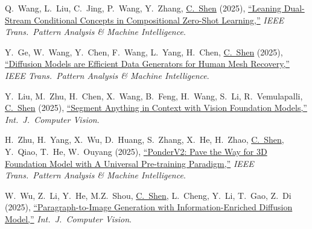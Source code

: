 \documentclass[9pt, a4paper]{article}
\newcommand{\years}[1]{\marginnote{\scriptsize #1}}
\def\highlight{\uline}
\begin{document}
\medskip

\years{2025} Q.~Wang, L.~Liu, C.~Jing, P.~Wang, Y.~Zhang, \highlight{C.~Shen} (2025),
\href{http://www.google.com/search?lr=&ie=UTF-8&oe=UTF-8&q=Leaning+Dual-Stream+Conditional+Concepts+in+Compositional+Zero-Shot+Learning+Qingsheng+Wang%2C+Lingqiao+Liu%2C+Chenchen+Jing%2C+Peng+Wang%2C+Yanning+Zhang%2C+Chunhua+Shen}{``Leaning Dual-Stream Conditional Concepts in Compositional Zero-Shot Learning,{}''}
\emph{IEEE Trans.\  Pattern Analysis \& Machine Intelligence}.

\medskip

\years{2025} Y.~Ge, W.~Wang, Y.~Chen, F.~Wang, L.~Yang, H.~Chen, \highlight{C.~Shen} (2025),
\href{http://www.google.com/search?lr=&ie=UTF-8&oe=UTF-8&q=Diffusion+Models+are+Efficient+Data+Generators+for+Human+Mesh+Recovery+Yongtao+Ge%2C+Wenjia+Wang%2C+Yongfan+Chen%2C+Fanzhou+Wang%2C+Lei+Yang%2C+Hao+Chen%2C+Chunhua+Shen}{``Diffusion Models are Efficient Data Generators for Human Mesh Recovery,{}''}
\emph{IEEE Trans.\  Pattern Analysis \& Machine Intelligence}.

\medskip

\years{2025} Y.~Liu, M.~Zhu, H.~Chen, X.~Wang, B.~Feng, H.~Wang, S.~Li, R.~Vemulapalli, \highlight{C.~Shen} (2025),
\href{http://www.google.com/search?lr=&ie=UTF-8&oe=UTF-8&q=Segment+Anything+in+Context+with+Vision+Foundation+Models+Yang+Liu%2C+Muzhi+Zhu%2C+Hao+Chen%2C+Xinlong+Wang%2C+Bo+Feng%2C+Hao+Wang%2C+Shiyu+Li%2C+Raviteja+Vemulapalli%2C+Chunhua+Shen}{``Segment Anything in Context with Vision Foundation Models,{}''}
\emph{Int.\ J.\  Computer Vision}.

\medskip

\years{2025} H.~Zhu, H.~Yang, X.~Wu, D.~Huang, S.~Zhang, X.~He, H.~Zhao, \highlight{C.~Shen}, Y.~Qiao, T.~He, W.~Ouyang (2025),
\href{http://www.google.com/search?lr=&ie=UTF-8&oe=UTF-8&q=PonderV2%3A+Pave+the+Way+for+3D+Foundation+Model+with+A+Universal+Pre-training+Paradigm+Haoyi+Zhu%2C+Honghui+Yang%2C+Xiaoyang+Wu%2C+Di+Huang%2C+Sha+Zhang%2C+Xianglong+He%2C+Hengshuang+Zhao%2C+Chunhua+Shen%2C+Yu+Qiao%2C+Tong+He%2C+Wanli+Ouyang}{``{PonderV2}: Pave the Way for {3D} Foundation Model with A Universal Pre-training Paradigm,{}''}
\emph{IEEE Trans.\  Pattern Analysis \& Machine Intelligence}.

\medskip

\years{2025} W.~Wu, Z.~Li, Y.~He, M.Z.~Shou, \highlight{C.~Shen}, L.~Cheng, Y.~Li, T.~Gao, Z.~Di (2025),
\href{http://www.google.com/search?lr=&ie=UTF-8&oe=UTF-8&q=Paragraph-to-Image+Generation+with+Information-Enriched+Diffusion+Model+Weijia+Wu%2C+Zhuang+Li%2C+Yefei+He%2C+Mike+Zheng+Shou%2C+Chunhua+Shen%2C+Lele+Cheng%2C+Yan+Li%2C+Tingting+Gao%2C+Zhang+Di}{``Paragraph-to-Image Generation with Information-Enriched Diffusion Model,{}''}
\emph{Int.\ J.\  Computer Vision}.
\end{document}
